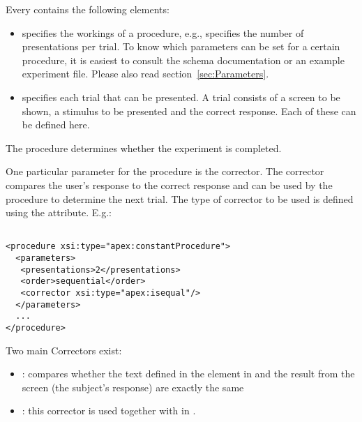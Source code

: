 Every  contains the following elements:

\begin{itemize}
\item {} specifies the workings of a procedure,
e.g., specifies the number of presentations per trial. To know which parameters can be set for a certain procedure, it is easiest to consult the schema documentation or an example experiment file.  Please also read section~\ref{sec:Parameters}.


\item {} specifies each
trial that can be presented. A trial consists of a screen to be
shown, a stimulus to be presented and the correct response. Each
of these can be defined here.
\end{itemize}

The procedure determines whether the experiment is completed.

One particular  parameter for the procedure is the corrector. The corrector compares the user's response to the correct response and can be used by the procedure to determine the next trial. The type of corrector to be used is defined using the  attribute. E.g.:

\begin{lstlisting}

<procedure xsi:type="apex:constantProcedure">
  <parameters>
   <presentations>2</presentations>
   <order>sequential</order>
   <corrector xsi:type="apex:isequal"/>
  </parameters>
  ...
</procedure>
\end{lstlisting}


Two main Correctors exist:
\begin{itemize}\item {}: compares whether the text defined in the  element in
 and the result from the screen (the subject's response) are exactly the same

\item {}: this corrector is used together with
 in .
\end{itemize}



